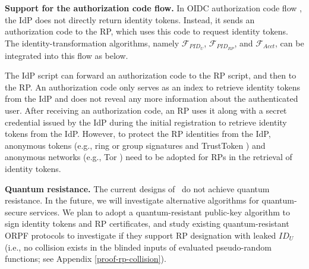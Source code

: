 \noindent \textbf{Support for the authorization code flow.} In OIDC authorization code flow \cite{OpenIDConnect}, the IdP does not directly return identity tokens.
Instead, it sends an authorization code to the RP, which uses this code to request identity tokens. The identity-transformation algorithms, namely $\mathcal{F}_{PID_{U}}$, $\mathcal{F}_{PID_{RP}}$, and $\mathcal{F}_{Acct}$, can be integrated into this flow as below. %

The IdP script can forward an authorization code to the RP script, and then to the RP. %
An authorization code only serves as an index to retrieve identity tokens from the IdP and does not reveal any more information about the authenticated user.
After receiving an authorization code, an RP uses it along with a secret credential issued by the IdP during the initial registration \cite{OpenIDConnect} to retrieve identity tokens from the IdP. However, to protect the RP identities from the IdP, anonymous tokens (e.g., ring or group signatures \cite{ring-sig,chaum1991group} and TrustToken \cite{trusttoken}) and anonymous networks (e.g., Tor \cite{tor}) need to be adopted for RPs in the retrieval of identity tokens.

\noindent \textbf{Quantum resistance.}
The current designs of \usso\ do not achieve quantum resistance.
In the future, we will investigate alternative algorithms for quantum-secure services.
We plan to adopt a quantum-resistant public-key algorithm to sign identity tokens and RP certificates,
    and study existing quantum-resistant ORPF protocols \cite{ideal-lattice-oprf,isogency-oprf}
 to investigate if they support RP designation with leaked $ID_U$ (i.e., no collision exists in the blinded inputs of evaluated pseudo-random functions; see Appendix \ref{proof-rp-collision}).





